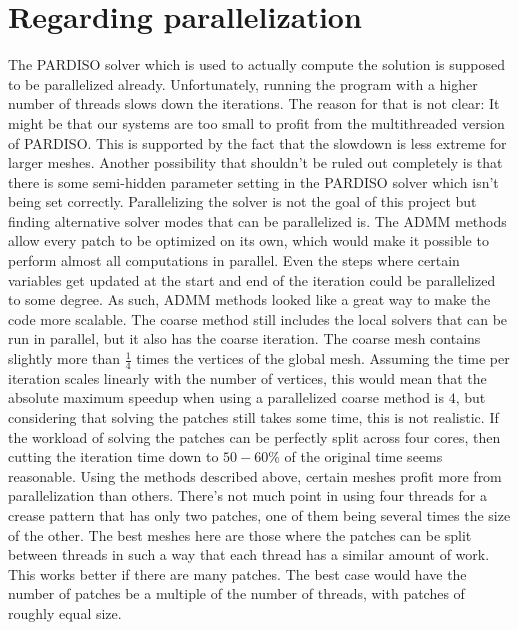 \documentclass[a4paper,twoside,12pt,nochapterprefix]{scrbook}
\begin{document}
\chapter{Regarding parallelization}\label{sec:parallelization}
The PARDISO solver which is used to actually compute the solution is supposed to be parallelized already. Unfortunately, running the program with a higher number of threads slows down the iterations. The reason for that is not clear: It might be that our systems are too small to profit from the multithreaded version of PARDISO. This is supported by the fact that the slowdown is less extreme for larger meshes. %
Another possibility that shouldn't be ruled out completely is that there is some semi-hidden parameter setting in the PARDISO solver which isn't being set correctly.\newline
Parallelizing the solver is not the goal of this project but finding alternative solver modes that can be parallelized is. The ADMM methods allow every patch to be optimized on its own, which would make it possible to perform almost all computations in parallel. Even the steps where certain variables get updated at the start and end of the iteration could be parallelized to some degree. As such, ADMM methods looked like a great way to make the code more scalable.\newline
The coarse method still includes the local solvers that can be run in parallel, but it also has the coarse iteration. The coarse mesh contains slightly more than $\frac{1}{4}$ times the vertices of the global mesh. Assuming the time per iteration scales linearly with the number of vertices, this would mean that the absolute maximum speedup when using a parallelized coarse method is $4$, but considering that solving the patches still takes some time, this is not realistic. If the workload of solving the patches can be perfectly split across four cores, then cutting the iteration time down to $50 - 60 \%$ of the original time seems reasonable.\newline
Using the methods described above, certain meshes profit more from parallelization than others. %
There's not much point in using four threads for a crease pattern that has only two patches, one of them being several times the size of the other. The best meshes here are those where the patches can be split between threads in such a way that each thread has a similar amount of work. This works better if there are many patches. The best case would have the number of patches be a multiple of the number of threads, with patches of roughly equal size.\newline
\end{document}
